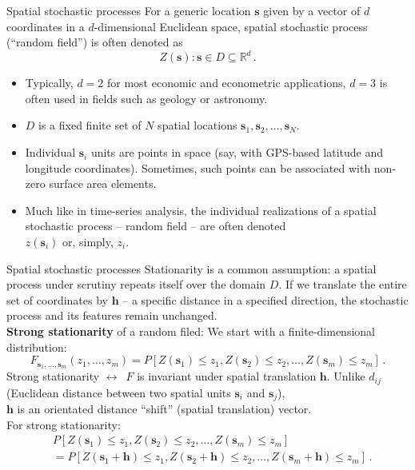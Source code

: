 \documentclass{beamer}
\begin{document}
\begin{frame}{Spatial stochastic processes}
For a generic location $\bm{s}$ given by a vector of $d$ coordinates in a $d$-dimensional Euclidean space, spatial stochastic process \\(``random field'') is often denoted as
$$ Z(\bm{s}): \bm{s} \in D \subseteq \mathbb{R}^d \, .$$
\vspace{-0.5cm}
\begin{itemize}
    \item Typically, $d=2$ for most economic and econometric applications, $d=3$ is often used in fields such as geology or astronomy. 
    \smallskip
    \item $D$ is a fixed finite set of $N$ spatial locations $\bm{s}_1, \bm{s}_2, \dots, \bm{s}_N$. 
    \smallskip
    \item Individual $\bm{s}_i$ units are points in space (say, with GPS-based latitude and longitude coordinates). Sometimes, such points can be associated with non-zero surface area elements.
    \item Much like in time-series analysis, the individual realizations of a spatial stochastic process -- random field -- are often denoted \\$z(\bm{s}_i)$ or, simply, $z_i$.
\end{itemize}
\end{frame}
\begin{frame}{Spatial stochastic processes}
Stationarity is a common assumption: a spatial process under scrutiny repeats itself over the domain $D$. If we translate the entire set of coordinates by $\bm{h}$ -- a specific distance in a specified direction, the stochastic process and its features remain unchanged.\\
\medskip
\textbf{Strong stationarity} of a random filed: We start with a finite-dimensional distribution: 
$$F_{\bm{s}_1, \dots,\bm{s}_m }(z_1,\dots, z_m) = P[Z(\bm{s}_1) \leq z_1, Z(\bm{s}_2) \leq z_2, \dots, Z(\bm{s}_m) \leq z_m] \, .$$  
Strong stationarity $\leftrightarrow$~$F$ is invariant under spatial translation $\bm{h}$. Unlike $d_{ij}$ (Euclidean distance between two spatial units $\bm{s}_i$ and $\bm{s}_j$), \\$\bm{h}$ is an orientated distance ``shift'' (spatial translation) vector. \\For strong stationarity:
\begin{equation*}
\begin{aligned}
& P \left[Z(\bm{s}_1) \leq z_1, Z(\bm{s}_2) \leq z_2, \dots, Z(\bm{s}_m) \leq z_m \right] \\
& = P \left[Z(\bm{s}_1+\bm{h}) \leq z_1, Z(\bm{s}_2+\bm{h}) \leq z_2, \dots, Z(\bm{s}_m+\bm{h}) \leq z_m \right] \, .
\end{aligned} 
\end{equation*}
\end{frame}
\end{document}
